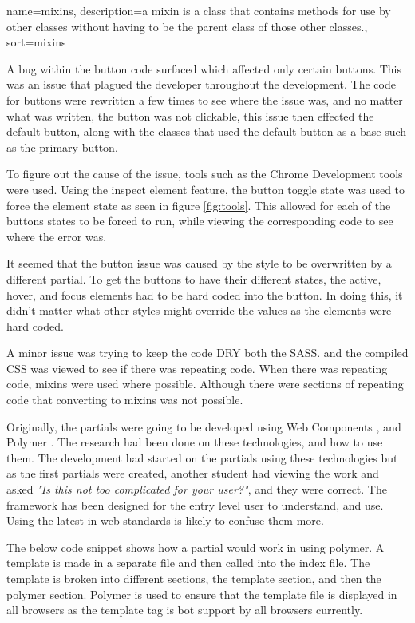 {
  name={mixins},
  description={a mixin is a class that contains methods for use by other classes without having to be the parent class of those other classes.},
  sort=mixins
}

A bug within the button code surfaced which affected only certain buttons. This was an issue that plagued the developer throughout the development. The code for buttons were rewritten a few times to see where the issue was, and no matter what was written, the button was not clickable, this issue then effected the default button, along with the classes that used the default button as a base such as the primary button. 

To figure out the cause of the issue, tools such as the Chrome Development tools were used. Using the inspect element feature, the button toggle state was used to force the element state as seen in figure \ref{fig:tools}. This allowed for each of the buttons states to be forced to run, while viewing the corresponding code to see where the error was. 

It seemed that the button issue was caused by the style to be overwritten by a different partial. To get the buttons to have their different states, the active, hover, and focus elements had to be hard coded into the button. In doing this, it didn't matter what other styles might override the values as the elements were hard coded.

A minor issue was trying to keep the code \gls{DRY} both the \gls{SASS}. and the compiled \gls{CSS} was viewed to see if there was repeating code. When there was repeating code, \gls{mixins} were used where possible. Although there were sections of repeating code that converting to \gls{mixins} was not possible. 

Originally, the partials were going to be developed using Web Components \citep{Web17}, and Polymer \citep{Google17b}. The research had been done on these technologies, and how to use them. The development had started on the partials using these technologies but as the first partials were created, another student had viewing the work and asked \textit{"Is this not too complicated for your user?"}, and they were correct. The framework has been designed for the entry level user to understand, and use. Using the latest in web standards is likely to confuse them more.

The below code snippet shows how a partial would work in using polymer. A template is made in a separate file and then called into the index file. The template is broken into different sections, the template section, and then the polymer section. Polymer is used to ensure that the template file is displayed in all browsers as the template tag is bot support by all browsers currently. 

